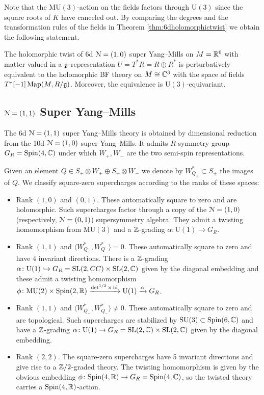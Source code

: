 \documentclass[10pt, oneside]{article}
\newcommand{\MU}{\mathrm{MU}}
\renewcommand{\U}{\mathrm{U}}
\begin{document}
Note that the $\MU(3)$-action on the fields factors through $\U(3)$ since the square roots of $K$ have canceled out. By comparing the degrees and the transformation rules of the fields in Theorem \ref{thm:6dholomorphictwist} we obtain the following statement.

\begin{theorem}
The holomorphic twist of 6d $\mathcal N=(1, 0)$ super Yang--Mills on $M=\mathbb R^6$ with matter valued in a $\mathfrak g$-representation $U=T^*R=R\oplus R^*$ is perturbatively equivalent to the holomorphic BF theory on $M\cong \mathbb C^3$ with the space of fields $T^*[-1]\operatorname{Map}(M, R/\mathfrak g)$. Moreover, the equivalence is $\U(3)$-equivariant.
\label{thm:6dholomorphictwistgraded}
\end{theorem}

\subsection{\texorpdfstring{$\mathcal N=(1, 1)$}{N=(1, 1)} Super Yang--Mills}

The 6d $\mathcal N=(1, 1)$ super Yang--Mills theory is obtained by dimensional reduction from the 10d $\mathcal N=(1, 0)$ super Yang--Mills. It admits $R$-symmetry group $G_R=\mathrm{Spin}(4, \mathbb C)$ under which $W_+, W_-$ are the two semi-spin representations.

Given an element $Q\in S_+\otimes W_+\oplus S_-\otimes W_-$ we denote by $W^*_{Q_\pm}\subset S_\pm$ the images of $Q$. We classify square-zero supercharges according to the ranks of these spaces:
\begin{itemize}
\item Rank $(1, 0)$ and $(0, 1)$. These automatically square to zero and are holomorphic.  Such supercharges factor through a copy of the $\mathcal{N}=(1,0)$ (respectively, $\mathcal N=(0, 1)$) supersymmetry algebra. They admit a twisting homomorphism from $\MU(3)$ and a $\mathbb Z$-grading $\alpha\colon \U(1)\rightarrow G_R$.

\item Rank $(1, 1)$ and $\langle W^*_{Q_+}, W^*_{Q_-}\rangle = 0$. These automatically square to zero and have 4 invariant directions. There is a $\mathbb Z$-grading $\alpha\colon \U(1)\hookrightarrow G_R=\SL(2, CC)\times \SL(2, \CC)$ given by the diagonal embedding and these admit a twisting homomorphism $\phi\colon \MU(2)\times \Spin(2, \RR)\xrightarrow{\det^{1/2}\times \id}\U(1)\xrightarrow{\alpha} G_R$.

\item Rank $(1, 1)$ and $\langle W^*_{Q_+}, W^*_{Q_-}\rangle \neq 0$. These automatically square to zero and are topological. Such supercharges are stabilized by $\mathrm{SU}(3)\subset \mathrm{Spin}(6, \mathbb C)$ and have a $\mathbb Z$-grading $\alpha\colon \U(1)\rightarrow G_R=\SL(2, \CC)\times \SL(2, \CC)$ given by the diagonal embedding.

\item Rank $(2, 2)$. The square-zero supercharges have 5 invariant directions and give rise to a $\mathbb Z/2$-graded theory. The twisting homomorphism is given by the obvious embedding $\phi\colon \mathrm{Spin}(4, \mathbb R)\rightarrow G_R=\mathrm{Spin}(4, \mathbb C)$, so the twisted theory carries a $\mathrm{Spin}(4, \mathbb R)$-action.
\end{itemize}
\end{document}
